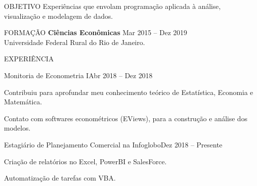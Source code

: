 \documentclass{resume} %
\begin{document}

\begin{rSection}{OBJETIVO}
    Experiências que envolam programação aplicada à análise, visualização e modelagem de dados.
    \vspace{5mm}
\end{rSection}


\begin{rSection}{FORMAÇÃO}
    {\bf Ciências Econômicas} \hfill {Mar 2015 -- Dez 2019}
    \\
    Universidade Federal Rural do Rio de Janeiro.
    \\
\end{rSection}


\begin{rSection}{EXPERIÊNCIA}
    \begin{rSubsection}{Monitoria de Econometria I}{Abr 2018 -- Dez 2018}{}
    \item
    \item Contribuiu para aprofundar meu conhecimento teórico de Estatística, Economia e Matemática.
    \item Contato com softwares econométricos (EViews), para a construção e análise dos modelos.
        \vspace{5mm}
    \end{rSubsection}

    \begin{rSubsection}{Estagiário de Planejamento Comercial na Infoglobo}{Dez 2018 -- Presente}{}
    \item
    \item Criação de relatórios no Excel, PowerBI e SalesForce.
    \item Automatização de tarefas com VBA.
        \vspace{5mm}
    \end{rSubsection}
\end{rSection}
\end{document}
